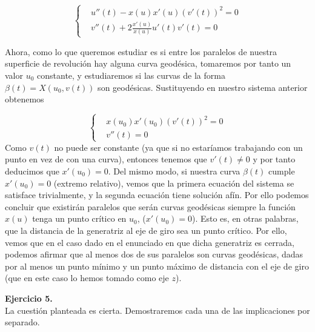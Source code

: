 \documentclass[fleqn]{article}
\begin{document}
    $$\left\{
    \begin{aligned}
        & u''(t) - x(u)x'(u) (v'(t))^2 = 0\\
        & v''(t) + 2\frac{x'(u)}{x(u)} u'(t) v'(t) = 0
    \end{aligned}
    \right.$$

    Ahora, como lo que queremos estudiar es si entre los paralelos de nuestra superficie de revolución hay alguna curva geodésica, tomaremos por tanto un valor $u_0$ 
    constante, y estudiaremos si las curvas de la forma $\beta(t) = X(u_0, v(t))$ son geodésicas. Sustituyendo en nuestro sistema anterior obtenemos

    $$\left\{
    \begin{aligned}
        & x(u_0)x'(u_0) (v'(t))^2 = 0\\
        & v''(t) = 0
    \end{aligned}
    \right.$$
    Como $v(t)$ no puede ser constante (ya que si no estaríamos trabajando con un punto en vez de con una curva), entonces tenemos que $v'(t) \neq 0$ y por tanto deducimos
    que $x'(u_0) = 0$. Del mismo modo, si nuestra curva $\beta(t)$ cumple $x'(u_0) = 0$ (extremo relativo), vemos que la primera ecuación del sistema se satisface trivialmente, y la segunda
    ecuación tiene solución afín. Por ello podemos concluir que existirán paralelos que serán curvas geodésicas siempre la función $x(u)$ tenga un punto crítico en $u_0$,
    ($x'(u_0) = 0$). Esto es, en otras palabras, que la distancia de la generatriz al eje de giro sea un punto crítico. Por ello, vemos que en el caso dado en el enunciado
    en que dicha generatriz es cerrada, podemos afirmar que al menos dos de sus paralelos son curvas geodésicas, dadas por al menos un punto mínimo y un punto máximo de 
    distancia con el eje de giro (que en este caso lo hemos tomado como eje $z$).

    \newpage


























    \textbf{Ejercicio 5. } \\

    La cuestión planteada es cierta. Demostraremos cada una de las implicaciones por separado.\\
\end{document}
